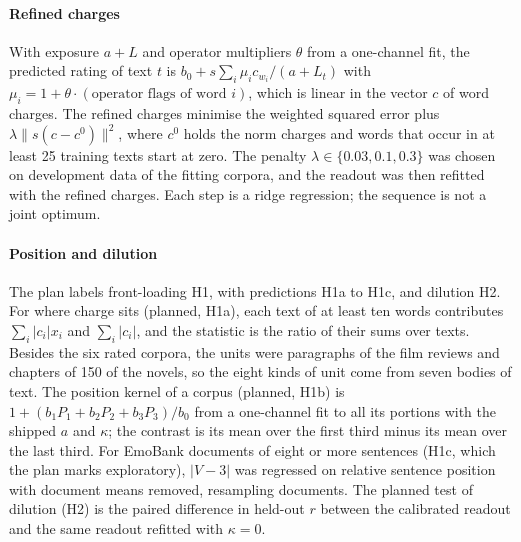 \paragraph{Refined charges}
With exposure $a+L$ and operator multipliers $\theta$ from a one-channel fit, the predicted rating of text $t$ is $b_0+s\sum_i \mu_i c_{w_i}/(a+L_t)$ with $\mu_i=1+\theta\cdot(\text{operator flags of word }i)$, which is linear in the vector $c$ of word charges. The refined charges minimise the weighted squared error plus $\lambda\lVert s(c-c^{0})\rVert^2$, where $c^0$ holds the norm charges and words that occur in at least 25 training texts start at zero. The penalty $\lambda\in\{0.03,0.1,0.3\}$ was chosen on development data of the fitting corpora, and the readout was then refitted with the refined charges. Each step is a ridge regression; the sequence is not a joint optimum.

\paragraph{Position and dilution}
The plan labels front-loading H1, with predictions H1a to H1c, and dilution H2. For where charge sits (planned, H1a), each text of at least ten words contributes $\sum_i|c_i|x_i$ and $\sum_i|c_i|$, and the statistic is the ratio of their sums over texts. Besides the six rated corpora, the units were paragraphs of the film reviews and chapters of 150 of the novels, so the eight kinds of unit come from seven bodies of text. The position kernel of a corpus (planned, H1b) is $1+(b_1P_1+b_2P_2+b_3P_3)/b_0$ from a one-channel fit to all its portions with the shipped $a$ and $\kappa$; the contrast is its mean over the first third minus its mean over the last third. For EmoBank documents of eight or more sentences (H1c, which the plan marks exploratory), $|V-3|$ was regressed on relative sentence position with document means removed, resampling documents. The planned test of dilution (H2) is the paired difference in held-out $r$ between the calibrated readout and the same readout refitted with $\kappa=0$.

